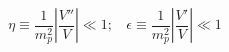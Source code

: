 \begin{equation}
\eta   \equiv   \frac{1}{m_p^2} \left |\frac{V''}{V} \right | \ll 1; ~~~~
\epsilon  \equiv   \frac{1}{m_p^2} \left |\frac{V'}{V} \right | \ll 1
\end{equation}

